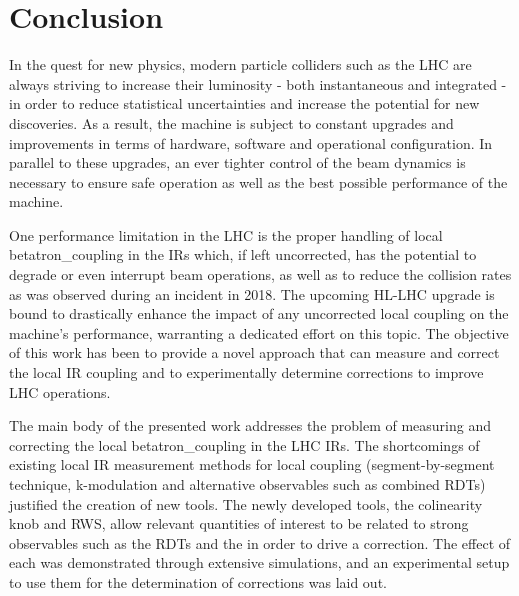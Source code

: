 \chapter{Conclusion}
\label{chapter:conclusion}

In the quest for new physics, modern particle colliders such as the \gls{LHC} are always striving to increase their \gls{luminosity} - both instantaneous and integrated - in order to reduce statistical uncertainties and increase the potential for new discoveries.
As a result, the machine is subject to constant upgrades and improvements in terms of hardware, software and operational configuration.
In parallel to these upgrades, an ever tighter control of the \gls{beam} dynamics is necessary to ensure safe operation as well as the best possible performance of the machine.

One performance limitation in the \gls{LHC} is the proper handling of local \gls{betatron_coupling} in the \glspl{IR} which, if left uncorrected, has the potential to degrade or even interrupt beam operations, as well as to reduce the collision rates as was observed during an incident in \num{2018}.
The upcoming \gls{HL-LHC} upgrade is bound to drastically enhance the impact of any uncorrected local coupling on the machine's performance, warranting a dedicated effort on this topic.
The objective of this work has been to provide a novel approach that can measure and correct the local \gls{IR} coupling and to experimentally determine corrections to improve \gls{LHC} operations.
\break

The main body of the presented work addresses the problem of measuring and correcting the local \gls{betatron_coupling} in the LHC \glspl{IR}.
The shortcomings of existing local \gls{IR} measurement methods for local coupling (segment-by-segment technique, k-modulation and alternative observables such as combined \glspl{RDT}) justified the creation of new tools.
The newly developed tools, the colinearity \gls{knob} and \gls{RWS}, allow relevant quantities of interest to be related to strong observables such as the \glspl{RDT} and the  in order to drive a correction.
The effect of each was demonstrated through extensive simulations, and an experimental setup to use them for the determination of corrections was laid out.

